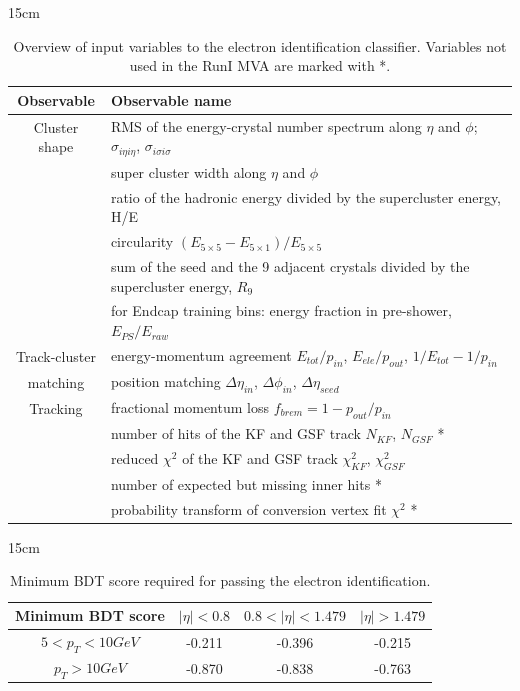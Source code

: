 \begin{table}[hbtp]{15cm}
	\caption{Overview of input variables to the electron identification classifier. Variables not used in the RunI MVA are marked with *.}	
	\footnotesize
	\centering
	\begin{tabular}{c|p{11.5cm}}
		\hline
		Observable & Observable name\\
		\hline
		Cluster shape & RMS of the energy-crystal number spectrum along $\eta$ and $\phi$; $\sigma_{i\eta i\eta}$, $\sigma_{i\sigma i\sigma}$\\
		& super cluster width along $\eta$ and $\phi$\\
		& ratio of the hadronic energy divided by the supercluster energy, H/E\\
		& circularity $(E_{5×5}−E_{5×1})/E_{5×5}$\\
		& sum of the seed and the 9 adjacent crystals divided by the supercluster energy, $R_{9}$\\
		& for Endcap training bins: energy fraction in pre-shower, $E_{PS}/E_{raw}$\\
		\hline
		Track-cluster & energy-momentum agreement $E_{tot} /p_{in}$, $E_{ele}/p_{out}$, $1/E_{tot}−1/p_{in}$\\
		matching & position matching $\Delta\eta_{in}$, $\Delta\phi_{in}$, $\Delta\eta_{seed}$\\
		\hline
		Tracking & fractional momentum loss $f_{brem}=1−p_{out}/p_{in}$\\
		& number of hits of the KF and GSF track $N_{KF}$, $N_{GSF}$ *\\
		& reduced $\chi^{2}$ of the KF and GSF track $\chi^{2}_{KF}$, $\chi^{2}_{GSF}$\\
		& number of expected but missing inner hits *\\
		& probability transform of conversion vertex fit $\chi^{2}$ *\\
		\hline
	\end{tabular}
	\label{tab:electron_classifier_vars}
\end{table}

\begin{table}[hbtp]{15cm}
	\caption{Minimum BDT score required for passing the electron identification.}
	\centering
	\begin{tabular}{c|c|c|c}
		\hline
		Minimum BDT score & $|\eta| < 0.8$ & $0.8 < |\eta| < 1.479$ & $|\eta| > 1.479$\\
		\hline
		$5 < p_{T} < 10 GeV$ & -0.211 & -0.396 & -0.215\\
		$p_{T} > 10 GeV$	 & -0.870 & -0.838 & -0.763\\
		\hline
	\end{tabular}
	\label{tab:bdt_minimum_score_electron}
\end{table}

